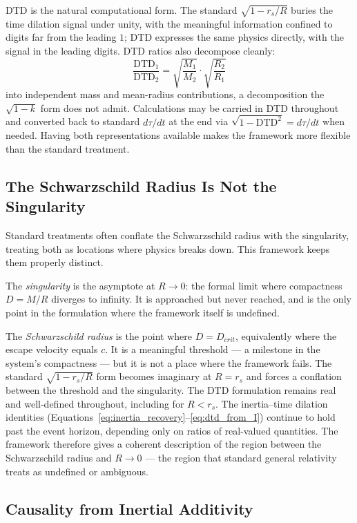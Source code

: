 \documentclass[twoside,twocolumn,9pt]{article}
\begin{document}
DTD is the natural computational form. The standard $\sqrt{1 - r_s/R}$ buries the time dilation signal under unity, with the meaningful information confined to digits far from the leading $1$; DTD expresses the same physics directly, with the signal in the leading digits. DTD ratios also decompose cleanly:
\[
\frac{\text{DTD}_1}{\text{DTD}_2} = \sqrt{\frac{M_1}{M_2}} \cdot \sqrt{\frac{R_2}{R_1}}
\]
into independent mass and mean-radius contributions, a decomposition the $\sqrt{1-k}$ form does not admit. Calculations may be carried in DTD throughout and converted back to standard $d\tau/dt$ at the end via $\sqrt{1 - \text{DTD}^2} = d\tau/dt$ when needed. Having both representations available makes the framework more flexible than the standard treatment.

\subsection{The Schwarzschild Radius Is Not the Singularity}

Standard treatments often conflate the Schwarzschild radius with the singularity, treating both as locations where physics breaks down. This framework keeps them properly distinct.

The \textit{singularity} is the asymptote at $R \to 0$: the formal limit where compactness $D = M/R$ diverges to infinity. It is approached but never reached, and is the only point in the formulation where the framework itself is undefined.

The \textit{Schwarzschild radius} is the point where $D = D_{crit}$, equivalently where the escape velocity equals $c$. It is a meaningful threshold --- a milestone in the system's compactness --- but it is not a place where the framework fails. The standard $\sqrt{1 - r_s/R}$ form becomes imaginary at $R = r_s$ and forces a conflation between the threshold and the singularity. The DTD formulation remains real and well-defined throughout, including for $R < r_s$. The inertia--time dilation identities (Equations~\ref{eq:inertia_recovery}--\ref{eq:dtd_from_I}) continue to hold past the event horizon, depending only on ratios of real-valued quantities. The framework therefore gives a coherent description of the region between the Schwarzschild radius and $R \to 0$ --- the region that standard general relativity treats as undefined or ambiguous.

\subsection{Causality from Inertial Additivity}
\end{document}
